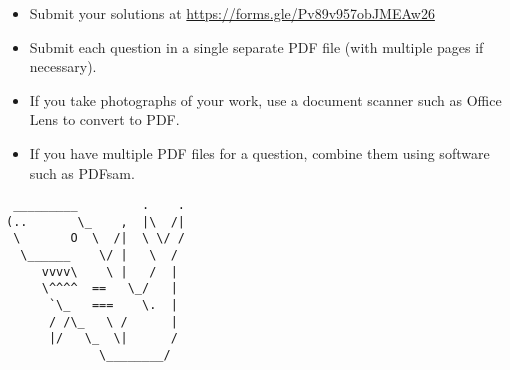 \documentclass{article}
\begin{document}
\vfill
\small
\begin{itemize}
	\item Submit your solutions at \href{https://forms.gle/Pv89v957obJMEAw26}{https://forms.gle/Pv89v957obJMEAw26}
	\item Submit each question in a single separate PDF file (with multiple pages if necessary).
	\item If you take photographs of your work, use a document scanner such as Office Lens to convert to PDF.
	\item If you have multiple PDF files for a question, combine them using software such as PDFsam.
\end{itemize}

\vfill
\centering
\small
\begin{BVerbatim}
 _________         .    .
(..       \_    ,  |\  /|
 \       O  \  /|  \ \/ /
  \______    \/ |   \  / 
     vvvv\    \ |   /  |
     \^^^^  ==   \_/   |
      `\_   ===    \.  |
      / /\_   \ /      |
      |/   \_  \|      /
             \________/
\end{BVerbatim}
\end{document}

